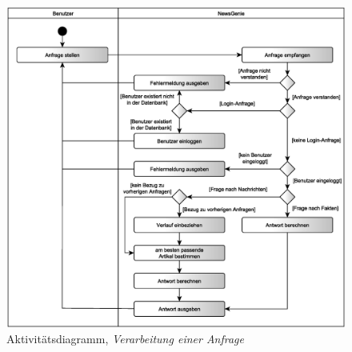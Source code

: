 \begin{figure}[h]
\centering
\includegraphics[width=1\textwidth]{Systementwurf/01_einleitung/request.eps}
\caption{Aktivitätsdiagramm, \textit{Verarbeitung einer Anfrage}
\label{1.6}}
\end{figure}

